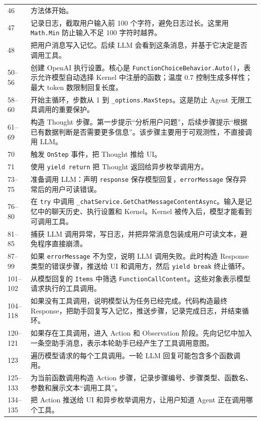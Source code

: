 \documentclass[UTF8,a4paper,11pt]{ctexart}
\begin{document}
\begin{longtable}{p{2.4cm}p{12.6cm}}
46 & 方法体开始。\\
47 & 记录日志，截取用户输入前 100 个字符，避免日志过长。这里用 \texttt{Math.Min} 防止输入不足 100 字符时越界。\\
48 & 把用户消息写入记忆。后续 LLM 会看到这条消息，并基于它决定是否调用工具。\\
50--56 & 创建 OpenAI 执行设置。核心是 \texttt{FunctionChoiceBehavior.Auto()}，表示允许模型自动选择 Kernel 中注册的函数；温度 0.7 控制生成多样性；最大 token 数限制回复长度。\\
58--60 & 开始主循环，步数从 1 到 \texttt{\_options.MaxSteps}。这是防止 Agent 无限工具调用的重要保护。\\
61--69 & 构造 Thought 步骤。第一步提示“分析用户问题”，后续步骤提示“根据已有数据判断是否需要更多信息”。该步骤主要用于可观测性，不直接调用 LLM。\\
70 & 触发 \texttt{OnStep} 事件，把 Thought 推给 UI。\\
71 & 使用 \texttt{yield return} 把 Thought 返回给异步枚举调用方。\\
73--75 & 准备调用 LLM：声明 \texttt{response} 保存模型回复，\texttt{errorMessage} 保存异常后的用户可读错误。\\
76--80 & 在 \texttt{try} 中调用 \texttt{\_chatService.GetChatMessageContentAsync}。输入是记忆中的聊天历史、执行设置和 Kernel。Kernel 被传入后，模型才能看到可调用工具。\\
81--85 & 捕获 LLM 调用异常，写日志，并把异常消息包装成用户可读文本，避免程序直接崩溃。\\
87--99 & 如果 \texttt{errorMessage} 不为空，说明 LLM 调用失败。此时构造 Response 类型的错误步骤，推送给 UI 和调用方，然后 \texttt{yield break} 终止循环。\\
101--102 & 从模型回复的 \texttt{Items} 中筛选 \texttt{FunctionCallContent}。这些对象表示模型请求执行的工具调用。\\
104--118 & 如果没有工具调用，说明模型认为任务已经完成。代码构造最终 Response，把助手回复写入记忆，推送步骤，记录完成日志，并结束循环。\\
120--121 & 如果存在工具调用，进入 Action 和 Observation 阶段。先向记忆中加入一条空助手消息，表示本轮助手已经产生了工具调用意图。\\
123 & 遍历模型请求的每个工具调用。一轮 LLM 回复可能包含多个函数调用。\\
125--133 & 为当前函数调用构造 Action 步骤，记录步骤编号、步骤类型、函数名、参数和展示文本“调用工具”。\\
134--135 & 把 Action 推送给 UI 和异步枚举调用方，让用户知道 Agent 正在调用哪个工具。\\

\end{longtable}
\end{document}
